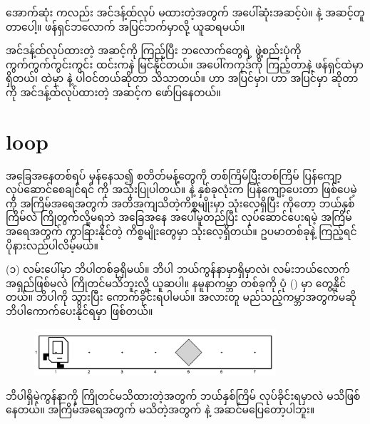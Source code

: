အောက်ဆုံး  ကလည်း အင်ဒန့်ထ်လုပ် မထားတဲ့အတွက် အပေါ်ဆုံးအဆင့်ပဲ။  နဲ့ အဆင့်တူတာပေါ့။  ဖန်ရှင်ဘလောက် အပြင်ဘက်မှာလို့ ယူဆရမယ်။ 

အင်ဒန့်ထ်လုပ်ထားတဲ့ အဆင့်ကို ကြည့်ပြီး ဘလောက်တွေရဲ့ ဖွဲ့စည်းပုံကို ကွက်ကွက်ကွင်းကွင်း ထင်းကနဲ မြင်နိုင်တယ်။ အပေါ်ကကုဒ်ကို ကြည့်တာနဲ့  ဖန်ရှင်ထဲမှာ   ရှိတယ်၊   ထဲမှာ  နဲ့  ပါဝင်တယ်ဆိုတာ သိသာတယ်။  ဟာ   အပြင်မှာ၊  ဟာ  အပြင်မှာ ဆိုတာကို အင်ဒန့်ထ်လုပ်ထားတဲ့ အဆင့်က ဖော်ပြနေတယ်။






\section{ loop}
အခြေအနေတစ်ရပ် မှန်နေသ၍ စတိတ်မန့်တွေကို တစ်ကြိမ်ပြီးတစ်ကြိမ် ပြန်ကျော့ လုပ်ဆောင်စေချင်ရင်   ကို အသုံးပြုပါတယ်။   နဲ့   နှစ်ခုလုံးက ပြန်ကျော့ပေးတာ ဖြစ်ပေမဲ့  ကို အကြိမ်အရေအတွက် အတိအကျသိတဲ့ကိစ္စမျိုးမှာ သုံးလေ့ရှိပြီး  ကိုတော့ ဘယ်နှစ်ကြိမ်လဲ ကြိုတွက်လို့မရဘဲ အခြေအနေ အပေါ်မူတည်ပြီး လုပ်ဆောင်ပေးရမဲ့ အကြိမ်အရေအတွက် ကွာခြားနိုင်တဲ့ ကိစ္စမျိုးတွေမှာ သုံးလေ့ရှိတယ်။ ဥပမာတစ်ခုနဲ့ ကြည့်ရင် ပိုနားလည်ပါလိမ့်မယ်။

(၁) လမ်းပေါ်မှာ ဘိပါတစ်ခုရှိမယ်။ ဘိပါ ဘယ်ကွန်နာမှာရှိမှာလဲ၊ လမ်းဘယ်လောက်အရှည်ဖြစ်မလဲ ကြိုတင်မသိဘူးလို့ ယူဆပါ။ နမူနာကမ္ဘာ တစ်ခုကို ပုံ (\fRefNo{\ref{fig:gpb1}}) မှာ တွေ့နိုင်တယ်။ ဘိပါကို သွားပြီး ကောက်ခိုင်းရပါမယ်။ အလားတူ မည်သည့်ကမ္ဘာအတွက်မဆို ဘိပါကောက်ပေးနိုင်ရမှာ ဖြစ်တယ်။
%
\begin{figure}[thb!]
    \includegraphics[width=0.8\textwidth]{images/ch02/gpb/at_fifth.jpg}
    \caption{}\label{fig:gpb1}
\end{figure}
%
ဘိပါရှိမဲ့ကွန်နာကို ကြိုတင်မသိထားတဲ့အတွက် ဘယ်နှစ်ကြိမ်  လုပ်ခိုင်းရမှာလဲ မသိဖြစ်နေတယ်။ အကြိမ်အရေအတွက် မသိတဲ့အတွက်   နဲ့ အဆင်မပြေတော့ပါဘူး။

